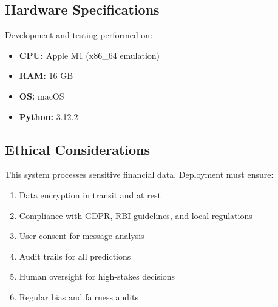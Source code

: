 \subsection{Hardware Specifications}

Development and testing performed on:
\begin{itemize}
    \item \textbf{CPU:} Apple M1 (x86\_64 emulation)
    \item \textbf{RAM:} 16 GB
    \item \textbf{OS:} macOS
    \item \textbf{Python:} 3.12.2
\end{itemize}

\subsection{Ethical Considerations}

This system processes sensitive financial data. Deployment must ensure:
\begin{enumerate}
    \item Data encryption in transit and at rest
    \item Compliance with GDPR, RBI guidelines, and local regulations
    \item User consent for message analysis
    \item Audit trails for all predictions
    \item Human oversight for high-stakes decisions
    \item Regular bias and fairness audits
\end{enumerate}
